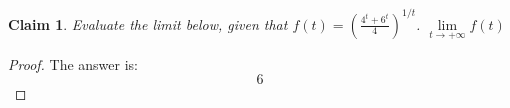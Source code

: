 \documentclass{article}
\newtheorem{theorem}{Claim}
\begin{document}
\begin{theorem}
Evaluate the limit below, given that $f(t)=\left(\frac{4^t+6^t}{4}\right)^{1/t}$. $\lim\limits_{t\to+\infty} f(t)$
\end{theorem}

\begin{proof}
The answer is:
\[
6
\]
\end{proof}
\end{document}
